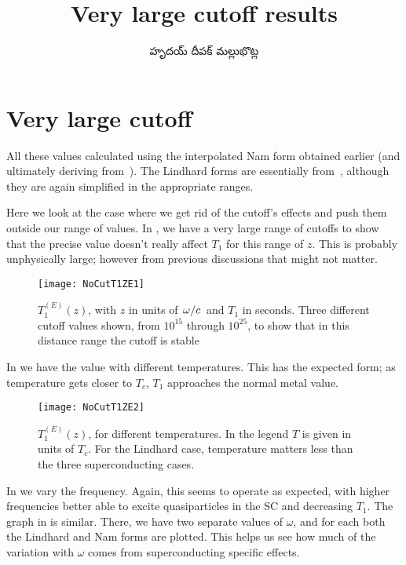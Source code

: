 \documentclass[../main.tex]{subfiles}
\title{Very large cutoff results}
\author{\begin{telugu}హృదయ్ దీపక్ మల్లుభొట్ల\end{telugu}}
\date{}
\begin{document}
	\graphicspath{{\main/figures/}}

	\onlyinsubfile{\maketitle}

	\section{Very large cutoff} \label{sec:nocut:intro}

	All these values calculated using the interpolated Nam form obtained earlier (and ultimately deriving from~\cite{Nam1967}).
	The Lindhard forms are essentially from~\cite{SolyomV3}, although they are again simplified in the appropriate ranges.

	Here we look at the case where we get rid of the cutoff's effects and push them outside our range of values.
	In , we have a very large range of cutoffs to show that the precise value doesn't really affect $T_1$ for this range of $z$.
	This is probably unphysically large;
	however from previous discussions that might not matter.

	\begin{figure}[htp]
		\centering
		\texttt{[image: NoCutT1ZE1]}
		\caption{$T_{1}^{(E)}(z)$, with $z$ in units of $\flatfrac{\omega}{c}$ and $T_1$ in seconds.
		Three different cutoff values shown, from $10^{15}$ through $10^{25}$, to show that in this distance range the cutoff is stable}\label{fig:t1ez}
	\end{figure}

	In  we have the value with different temperatures.
	This has the expected form;
	as temperature gets closer to $T_c$, $T_1$ approaches the normal metal value.

	\begin{figure}[htp]
		\centering
		\texttt{[image: NoCutT1ZE2]}
		\caption{$T_{1}^{(E)}(z)$, for different temperatures.
			In the legend $T$ is given in units of $T_c$.
			For the Lindhard case, temperature matters less than the three superconducting cases.
		} \label{fig:t2ez}
	\end{figure}

	In  we vary the frequency.
	Again, this seems to operate as expected, with higher frequencies better able to excite quasiparticles in the SC and decreasing $T_1$.
	The graph in  is similar.
	There, we have two separate values of $\omega$, and for each both the Lindhard and Nam forms are plotted.
	This helps us see how much of the variation with $\omega$ comes from superconducting specific effects.
\end{document}
